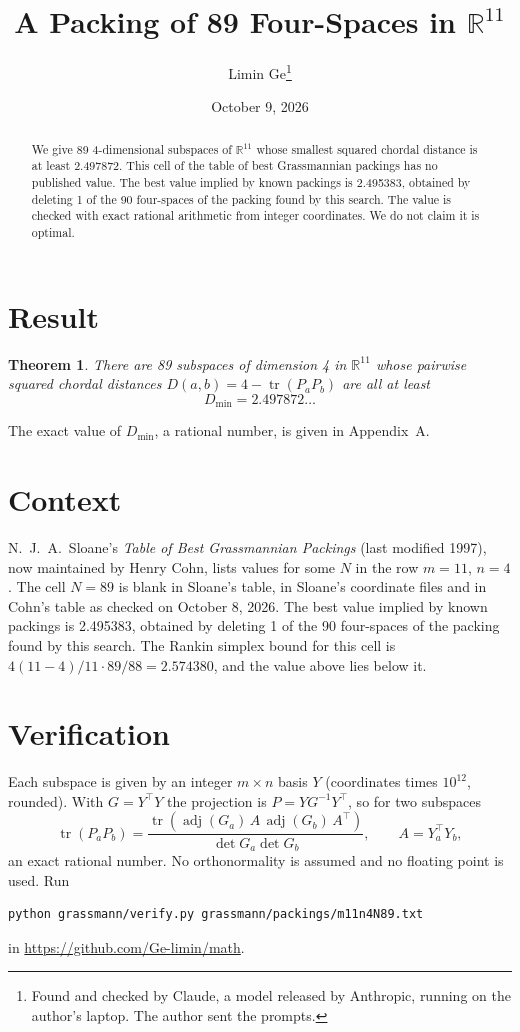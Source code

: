 \documentclass[11pt,a4paper]{article}
\title{A Packing of 89 Four-Spaces in $\mathbb{R}^{11}$}
\author{Limin Ge\thanks{Found and checked by Claude, a model released by Anthropic, running on the author's laptop. The author sent the prompts.}}
\date{October 9, 2026}
\newtheorem*{theorem}{Theorem}
\begin{document}
\maketitle
\begin{abstract}
We give 89 4-dimensional subspaces of $\mathbb{R}^{11}$ whose smallest squared chordal distance is at least 2.497872. This cell of the table of best Grassmannian packings has no published value. The best value implied by known packings is 2.495383, obtained by deleting 1 of the 90 four-spaces of the packing found by this search. The value is checked with exact rational arithmetic from integer coordinates. We do not claim it is optimal.
\end{abstract}

\section{Result}
\begin{theorem}
There are 89 subspaces of dimension 4 in $\mathbb{R}^{11}$ whose pairwise squared chordal distances $D(a,b) = 4 - \operatorname{tr}(P_aP_b)$ are all at least
\[ D_{\min} = 2.497872\ldots \]
\end{theorem}
The exact value of $D_{\min}$, a rational number, is given in Appendix~A.


\section{Context}
N.~J.~A.~Sloane's \emph{Table of Best Grassmannian Packings} (last modified 1997), now maintained by Henry Cohn, lists values for some $N$ in the row $m=11$, $n=4$. The cell $N=89$ is blank in Sloane's table, in Sloane's coordinate files and in Cohn's table as checked on October 8, 2026. The best value implied by known packings is 2.495383, obtained by deleting 1 of the 90 four-spaces of the packing found by this search. The Rankin simplex bound for this cell is $4(11-4)/11\cdot 89/88 = 2.574380$, and the value above lies below it.


\section{Verification}
Each subspace is given by an integer $m\times n$ basis $Y$ (coordinates times $10^{12}$, rounded). With $G=Y^\top Y$ the projection is $P=YG^{-1}Y^\top$, so for two subspaces
\[ \operatorname{tr}(P_aP_b)=\frac{\operatorname{tr}(\operatorname{adj}(G_a)\,A\,\operatorname{adj}(G_b)\,A^\top)}{\det G_a\det G_b},\qquad A=Y_a^\top Y_b, \]
an exact rational number. No orthonormality is assumed and no floating point is used. Run
\begin{verbatim}
python grassmann/verify.py grassmann/packings/m11n4N89.txt
\end{verbatim}
in \url{https://github.com/Ge-limin/math}.
\end{document}
